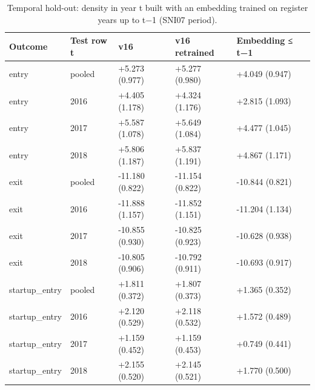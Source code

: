 \begin{table}
\caption{Temporal hold-out: density in year t built with an embedding trained on register years up to t−1 (SNI07 period).}
\label{tab:holdout_temporal_window}
\begin{tabular}{lllll}
\toprule
Outcome & Test row t & v16 & v16 retrained & Embedding ≤ t−1 \\
\midrule
entry & pooled & +5.273 (0.977) & +5.277 (0.980) & +4.049 (0.947) \\
entry & 2016 & +4.405 (1.178) & +4.324 (1.176) & +2.815 (1.093) \\
entry & 2017 & +5.587 (1.078) & +5.649 (1.084) & +4.477 (1.045) \\
entry & 2018 & +5.806 (1.187) & +5.837 (1.191) & +4.867 (1.171) \\
exit & pooled & -11.180 (0.822) & -11.154 (0.822) & -10.844 (0.821) \\
exit & 2016 & -11.888 (1.157) & -11.852 (1.151) & -11.204 (1.134) \\
exit & 2017 & -10.855 (0.930) & -10.825 (0.923) & -10.628 (0.938) \\
exit & 2018 & -10.805 (0.906) & -10.792 (0.911) & -10.693 (0.917) \\
startup\_entry & pooled & +1.811 (0.372) & +1.807 (0.373) & +1.365 (0.352) \\
startup\_entry & 2016 & +2.120 (0.529) & +2.118 (0.532) & +1.572 (0.489) \\
startup\_entry & 2017 & +1.159 (0.452) & +1.159 (0.453) & +0.749 (0.441) \\
startup\_entry & 2018 & +2.155 (0.520) & +2.145 (0.521) & +1.770 (0.500) \\
\bottomrule
\end{tabular}
\end{table}
